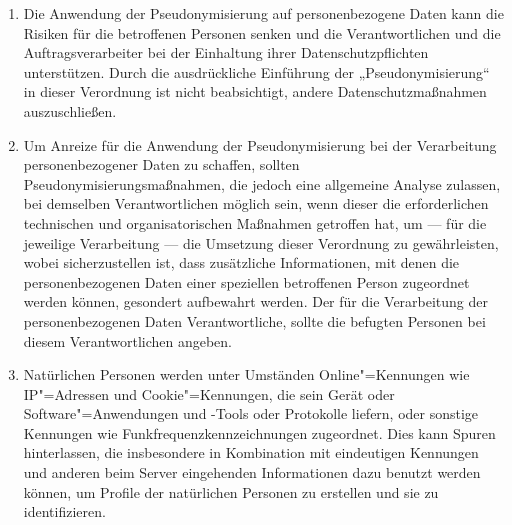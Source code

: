\begin{enumerate}

   \item Die Anwendung der Pseudonymisierung auf personenbezogene Daten kann die Risiken für die betroffenen Personen
    senken und die Verantwortlichen und die Auftragsverarbeiter bei der Einhaltung ihrer Datenschutzpflichten
    unterstützen. Durch die ausdrückliche Einführung der „Pseudonymisierung“ in dieser Verordnung ist nicht
    beabsichtigt, andere Datenschutzmaßnahmen auszuschließen.%
   \label{eg:28}
   

   \item Um Anreize für die Anwendung der Pseudonymisierung bei der Verarbeitung personenbezogener Daten zu schaffen,
    sollten Pseudonymisierungsmaßnahmen, die jedoch eine allgemeine Analyse zulassen, bei demselben Verantwortlichen
    möglich sein, wenn dieser die erforderlichen technischen und organisatorischen Maßnahmen getroffen hat, um — für
    die jeweilige Verarbeitung — die Umsetzung dieser Verordnung zu gewährleisten, wobei sicherzustellen ist, dass
    zusätzliche Informationen, mit denen die personenbezogenen Daten einer speziellen betroffenen Person zugeordnet
    werden können, gesondert aufbewahrt werden. Der für die Verarbeitung der personenbezogenen Daten Verantwortliche,
    sollte die befugten Personen bei diesem Verantwortlichen angeben.%
   \label{eg:29}
   

   \item Natürlichen Personen werden unter Umständen Online"=Kennungen wie IP"=Adressen und Cookie"=Kennungen, die sein
    Gerät oder Software"=Anwendungen und -Tools oder Protokolle liefern, oder sonstige Kennungen wie
    Funkfrequenzkennzeichnungen zugeordnet. Dies kann Spuren hinterlassen, die insbesondere in Kombination mit
    eindeutigen Kennungen und anderen beim Server eingehenden Informationen dazu benutzt werden können, um Profile der
    natürlichen Personen zu erstellen und sie zu identifizieren.%
   \label{eg:30}
   


\end{enumerate}
